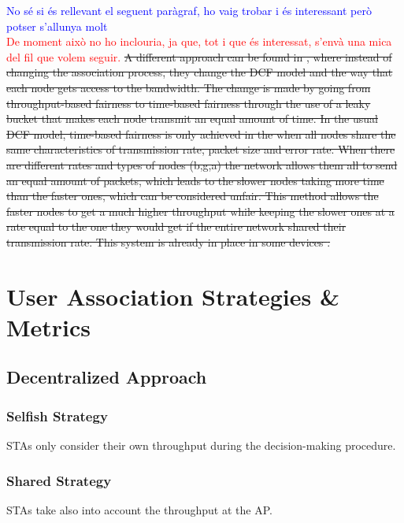 \documentclass{article}
\begin{document}
	\textcolor{blue}{No sé si és rellevant el seguent paràgraf, ho vaig trobar i és interessant però potser s'allunya molt}\\
	\textcolor{red}{De moment això no ho inclouria, ja que, tot i que és interessat, s'envà una mica del fil que volem seguir.}
	\sout{A different approach can be found in \cite{tan2004}, where instead of changing the association process, they change the DCF model and the way that each node gets access to the bandwidth. The change is made by going from throughput-based fairness to time-based fairness through the use of a leaky bucket that makes each node transmit an equal amount of time. In the usual DCF model, time-based fairness is only achieved in the  when all nodes share the same characteristics of transmission rate, packet size and error rate. When there are different rates and types of nodes (b,g,a) the network allows them all to send an equal amount of packets, which leads to the slower nodes taking more time than the faster ones, which can be considered unfair. This method allows the faster nodes to get a much higher throughput while keeping the slower ones at a rate equal to the one they would get if the entire network shared their transmission rate. This system is already in place in some devices \cite{aruba2010}.}
	
\section{User Association Strategies \& Metrics}
\label{section:strategies}

	\subsection{Decentralized Approach}
	\label{section:decentralized}
	
		\subsubsection{Selfish Strategy}
		\label{section:selfish}
			STAs only consider their own throughput during the decision-making procedure.
			
		\subsubsection{Shared Strategy}
		\label{section:shared}
			STAs take also into account the throughput at the AP.
	
\end{document}
